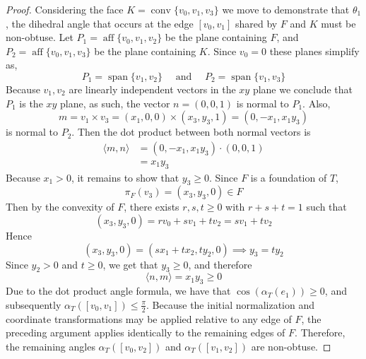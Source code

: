 \documentclass[10pt,a4paper]{amsart}
\begin{document}
\begin{proof}
	Considering the face $K = \operatorname{conv}\{v_0,v_1,v_3\}$ we move to demonstrate that $\theta_1$, the dihedral angle that occurs at the edge $[v_0,v_1]$ shared by $F$ and $K$ must be non-obtuse. Let $P_1 = \operatorname{aff}\{v_0,v_1,v_2\}$ be the plane containing $F$, and $P_2 = \operatorname{aff}\{v_0,v_1,v_3\}$ be the plane containing $K$. Since $v_0=0$ these planes simplify as,
	\[
	P_1= \operatorname{span} \{v_1,v_2\} \quad \text{ and } \quad P_2= \operatorname{span} \{v_1,v_3\}
	\]
	Because $v_1,v_2$ are linearly independent vectors in the $xy$ plane we conclude that $P_1$ is the $xy$ plane, as such, the vector $n=(0,0,1)$ is normal to $P_1$. Also, 
	\begin{equation*}
		m = v_1\times v_3 = (x_1,0,0) \times (x_3,y_3,1) = (0,-x_1,x_1y_3)
	\end{equation*}
	is normal to $P_2$. Then the dot product between both normal vectors is 
	\begin{align*}
		\langle m , n \rangle  &= (0,-x_1,x_1y_3) \cdot (0,0,1) \\
		&= x_1y_3
	\end{align*}
	Because $x_1>0$, it remains to show that $y_3 \ge 0$. Since $F$ is a foundation of $T$,
	\begin{equation*}
		\pi_F(v_3)= (x_3,y_3,0) \in F
	\end{equation*}
	Then by the convexity of $F$, there exists $r,s,t \ge 0$ with $r+s+t = 1$ such that
	\begin{equation*}
		(x_3,y_3,0) = rv_0+sv_1+tv_2 = sv_1+tv_2
	\end{equation*}
	Hence 
	\begin{equation*}
		(x_3,y_3,0) = (sx_1+tx_2,ty_2,0) \implies y_3 =ty_2
	\end{equation*}
	Since $y_2 >0$ and $t\ge 0$, we get that $y_3 \ge 0$, and therefore
	\begin{equation*}
		\langle n , m \rangle = x_1y_3 \ge 0 
	\end{equation*}
	Due to the dot product angle formula, we have that $\cos(\alpha_T(e_1)) \ge 0 $, and subsequently $\alpha_T([v_0,v_1]) \le \frac{\pi}{2}$. Because the initial normalization and coordinate transformations may be applied relative to any edge of $F$, the preceding argument applies identically to the remaining edges of $F$. Therefore, the remaining angles $\alpha_T([v_0,v_2])$ and $ \alpha_T([v_1,v_2])$ are non-obtuse.
	
	
	
	
	

\end{proof}
\end{document}

